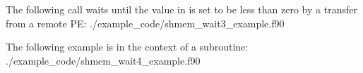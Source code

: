 \begin{apidefinition}
\begin{apiexamples}
\apicexample
{The following \CorCpp{} call waits until the value in  is set to
be less than zero by a transfer from a remote PE:}
{./example_code/shmem_wait3_example.f90}
{}

\apifexample
{The following \Fortran example is in the context of a subroutine:}
{./example_code/shmem_wait4_example.f90}
{}

\end{apiexamples}

\end{apidefinition}
